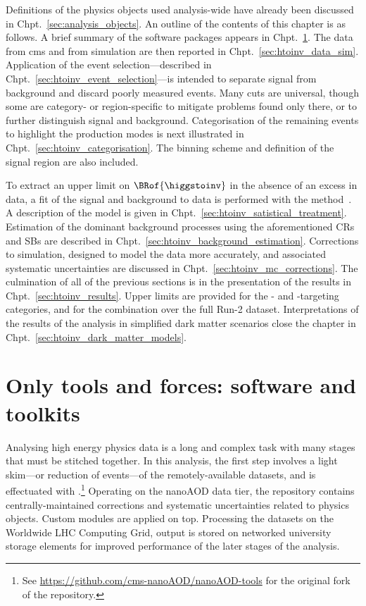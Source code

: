 Definitions of the physics objects used analysis-wide have already been discussed in Chpt.~\ref{sec:analysis_objects}. An outline of the contents of this chapter is as follows. A brief summary of the software packages appears in Chpt.~\ref{sec:htoinv_software}. The data from \acrshort{cms} and from simulation are then reported in Chpt.~\ref{sec:htoinv_data_sim}. Application of the event selection---described in Chpt.~\ref{sec:htoinv_event_selection}---is intended to separate signal from background and discard poorly measured events. Many cuts are universal, though some are category- or region-specific to mitigate problems found only there, or to further distinguish signal and background. Categorisation of the remaining events to highlight the production modes is next illustrated in Chpt.~\ref{sec:htoinv_categorisation}. The binning scheme and definition of the signal region are also included.

To extract an upper limit on $\BRof{\higgstoinv}$ in the absence of an excess in data, a fit of the signal and background to data is performed with the \CLs method~\cite{Read_2002}. A description of the model is given in Chpt.~\ref{sec:htoinv_satistical_treatment}. Estimation of the dominant background processes using the aforementioned \glspl{CR} and \glspl{SB} are described in Chpt.~\ref{sec:htoinv_background_estimation}. Corrections to simulation, designed to model the data more accurately, and associated systematic uncertainties are discussed in Chpt.~\ref{sec:htoinv_mc_corrections}. The culmination of all of the previous sections is in the presentation of the results in Chpt.~\ref{sec:htoinv_results}. Upper limits are provided for the \ttH- and \VH-targeting categories, and for the combination over the full Run-2 dataset. Interpretations of the results of the analysis in simplified dark matter scenarios close the chapter in Chpt.~\ref{sec:htoinv_dark_matter_models}.




\section{Only tools and forces: software and toolkits}
\label{sec:htoinv_software}

Analysing high energy physics data is a long and complex task with many stages that must be stitched together. In this analysis, the first step involves a light skim---or reduction of events---of the remotely-available datasets, and is effectuated with \nanoAODtools.\footnote{See \url{https://github.com/cms-nanoAOD/nanoAOD-tools} for the original fork of the repository.} Operating on the nanoAOD data tier, the repository contains centrally-maintained corrections and systematic uncertainties related to physics objects. Custom modules are applied on top. Processing the datasets on the Worldwide LHC Computing Grid, output is stored on networked university storage elements for improved performance of the later stages of the analysis.

